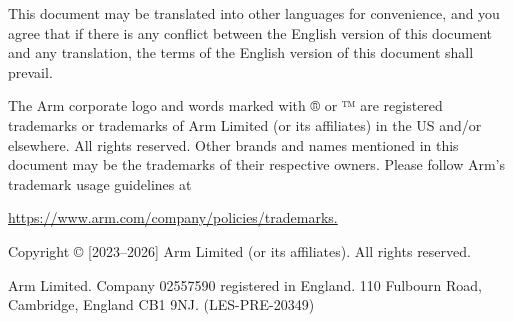 This document may be translated into other languages for convenience, and you
agree that if there is any conflict between the English version of this
document and any translation, the terms of the English version of this document
shall prevail.

The Arm corporate logo and words marked with ® or ™ are registered trademarks
or trademarks of Arm Limited (or its affiliates) in the US and/or elsewhere.
All rights reserved.  Other brands and names mentioned in this document may be
the trademarks of their respective owners. Please follow Arm’s trademark usage
guidelines at

\url{https://www.arm.com/company/policies/trademarks.}

Copyright © [2023--2026] Arm Limited (or its affiliates). All rights reserved.

Arm Limited. Company 02557590 registered in England.  110 Fulbourn Road,
Cambridge, England CB1 9NJ.  (LES-PRE-20349)
